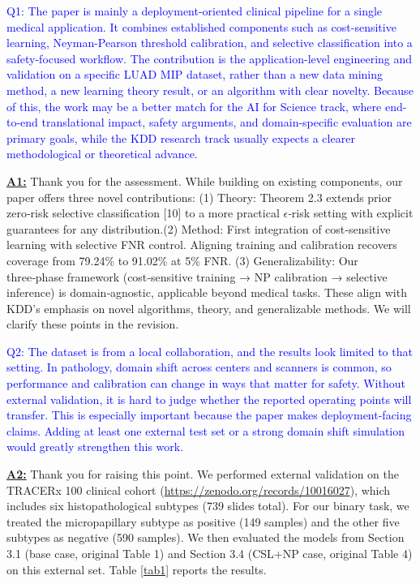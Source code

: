 \documentclass[UTF8,12pt]{article}
\begin{document}
\textcolor{blue}{Q1: The paper is mainly a deployment-oriented clinical pipeline for a single medical application. It combines established components such as cost-sensitive learning, Neyman-Pearson threshold calibration, and selective classification into a safety-focused workflow. The contribution is the application-level engineering and validation on a specific LUAD MIP dataset, rather than a new data mining method, a new learning theory result, or an algorithm with clear novelty. Because of this, the work may be a better match for the AI for Science track, where end-to-end translational impact, safety arguments, and domain-specific evaluation are primary goals, while the KDD research track usually expects a clearer methodological or theoretical advance.}

\underline{{\bf A1:}}  Thank you for the assessment. While building on existing components, our paper offers three novel contributions:
(1) Theory: Theorem 2.3 extends prior zero‑risk selective classification [10] to a more practical $\epsilon$‑risk setting with explicit guarantees for any distribution.(2) Method: First integration of cost‑sensitive learning with selective FNR control. Aligning training and calibration recovers coverage from 79.24\% to 91.02\% at 5\% FNR. (3) Generalizability: Our three‑phase framework (cost‑sensitive training → NP calibration → selective inference) is domain‑agnostic, applicable beyond medical tasks. These align with KDD’s emphasis on novel algorithms, theory, and generalizable methods. We will clarify these points in the revision.


\textcolor{blue}{Q2: The dataset is from a local collaboration, and the results look limited to that setting. In pathology, domain shift across centers and scanners is common, so performance and calibration can change in ways that matter for safety. Without external validation, it is hard to judge whether the reported operating points will transfer. This is especially important because the paper makes deployment-facing claims. Adding at least one external test set or a strong domain shift simulation would greatly strengthen this work.}

\underline{{\bf A2:}} Thank you for raising this point. We performed external validation on the TRACERx 100 clinical cohort (\url{https://zenodo.org/records/10016027}), which includes six histopathological subtypes (739 slides total). For our binary task, we treated the micropapillary subtype as positive (149 samples) and the other five subtypes as negative (590 samples). We then evaluated the models from Section 3.1 (base case, original Table 1) and Section 3.4 (CSL+NP case, original Table 4) on this external set. Table \ref{tab1} reports the results.
\end{document}
